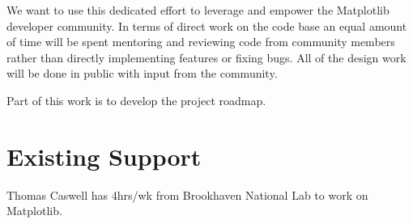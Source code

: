 \documentclass[11pt]{article}  %
\begin{document}
We want to use this dedicated effort to leverage and empower the
Matplotlib developer community.  In terms of direct work on the code
base an equal amount of time will be spent mentoring and reviewing
code from community members rather than directly implementing features
or fixing bugs.  All of the design work will be done in public with
input from the community.

Part of this work is to develop the project roadmap.


\section{Existing Support}

Thomas Caswell has 4hrs/wk from Brookhaven National Lab to work on Matplotlib.


\clearpage

\end{document}
